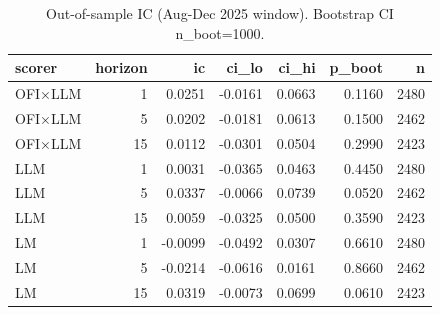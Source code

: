 \begin{table}[htbp]
\centering
\caption{Out-of-sample IC (Aug-Dec 2025 window). Bootstrap CI n\_boot=1000.}
\label{tab:oos_ic}
\begin{tabular}{lrrrrrr}
\toprule
scorer & horizon & ic & ci\_lo & ci\_hi & p\_boot & n \\
\midrule
OFI×LLM & 1 & 0.0251 & -0.0161 & 0.0663 & 0.1160 & 2480 \\
OFI×LLM & 5 & 0.0202 & -0.0181 & 0.0613 & 0.1500 & 2462 \\
OFI×LLM & 15 & 0.0112 & -0.0301 & 0.0504 & 0.2990 & 2423 \\
LLM & 1 & 0.0031 & -0.0365 & 0.0463 & 0.4450 & 2480 \\
LLM & 5 & 0.0337 & -0.0066 & 0.0739 & 0.0520 & 2462 \\
LLM & 15 & 0.0059 & -0.0325 & 0.0500 & 0.3590 & 2423 \\
LM & 1 & -0.0099 & -0.0492 & 0.0307 & 0.6610 & 2480 \\
LM & 5 & -0.0214 & -0.0616 & 0.0161 & 0.8660 & 2462 \\
LM & 15 & 0.0319 & -0.0073 & 0.0699 & 0.0610 & 2423 \\
\bottomrule
\end{tabular}
\end{table}

